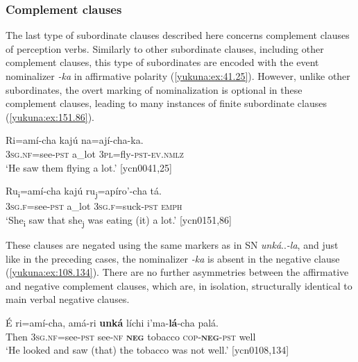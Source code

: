 \documentclass[output=paper,colorlinks,citecolor=brown]{langscibook}
\begin{document}
\subsubsection{Complement clauses}\label{yukuna:compl.cl}

The last type of subordinate clauses described here concerns complement clauses of perception verbs. Similarly to other subordinate clauses, including other complement clauses, this type of subordinates are encoded with the event nominalizer \textit{-ka} in affirmative polarity (\ref{yukuna:ex:41.25}). However, unlike other subordinates, the overt marking of nominalization is optional in these complement clauses, leading to many instances of finite subordinate clauses (\ref{yukuna:ex:151.86}).

\ea\label{yukuna:ex:41.25}
\gll Ri=amí-cha kajú na=ají-cha-ka. \\
\textsc{3sg.nf}=see-\textsc{pst} a\_lot \textsc{3pl}=fly-\textsc{pst}-\textsc{ev.nmlz} \\
\glt ‘He saw them flying a lot.’ [ycn0041,25]
\z

\ea\label{yukuna:ex:151.86}
\gll Ru\textup{\textsubscript{i}}=amí-cha kajú ru\textup{\textsubscript{j}}=apíro'-cha tá. \\
\textsc{3sg.f}=see-\textsc{pst} a\_lot \textsc{3sg.f}=suck-\textsc{pst} \textsc{emph} \\
\glt ‘She\textsubscript{i} saw that she\textsubscript{j} was eating (it) a lot.’ [ycn0151,86]
\z

These clauses are negated using the same markers as in SN \textit{unká}{..}\textit{-la}, and just like in the preceding cases, the nominalizer \textit{-ka} is absent in the negative clause (\ref{yukuna:ex:108.134}). There are no further asymmetries between the affirmative and negative complement clauses, which are, in isolation, structurally identical to main verbal negative clauses.

\ea\label{yukuna:ex:108.134}
\gll É ri=amí-cha, amá-ri \textbf{unká} líchi i'ma-\textbf{lá}-cha palá.   \\
Then \textsc{3sg.nf}=see-\textsc{pst} see-\textsc{nf} \textbf{\textsc{neg}} tobacco \textsc{cop}-\textbf{\textsc{neg}}-\textsc{pst} well \\
\glt ‘He looked and saw (that) the tobacco was not well.’ [ycn0108,134]
\z
\end{document}
